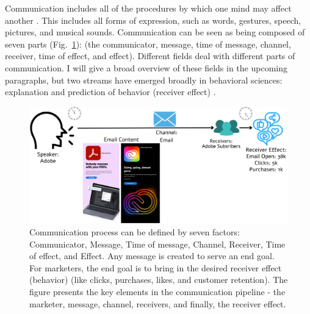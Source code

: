 \documentclass[hidelinks,11pt,a4paper]{report}
\renewcommand{\cite}[1]{\citep{#1}}
\begin{document}
Communication includes all of the procedures by which one mind may affect another \cite{shannon-weaver-1949}. This includes all forms of expression, such as words, gestures, speech, pictures, and musical sounds.
Communication can be seen as being composed of seven parts (Fig.~\ref{fig:factors-of-communication}): (the communicator, message, time of message, channel, receiver, time of effect, and effect). Different fields deal with different parts of communication. I will give a broad overview of these fields in the upcoming paragraphs, but two streams have emerged broadly in behavioral sciences: explanation and prediction of behavior (receiver effect) \cite{breiman2001statistical,hofman2017prediction,shmueli2010explain}. 


\begin{figure}[!t]
  \centering
  \includegraphics[width=1.0\textwidth]{images/factors of communication.pdf}
  \caption{Communication process can be defined by seven factors: Communicator, Message, Time of message, Channel, Receiver, Time of effect, and Effect. Any message is created to serve an end goal. For marketers, the end goal is to bring in the desired receiver effect (behavior) (like clicks, purchases, likes, and customer retention). The figure presents the key elements in the communication pipeline - the marketer, message, channel, receivers, and finally, the receiver effect.   \label{fig:factors-of-communication}}
\end{figure}
\end{document}
